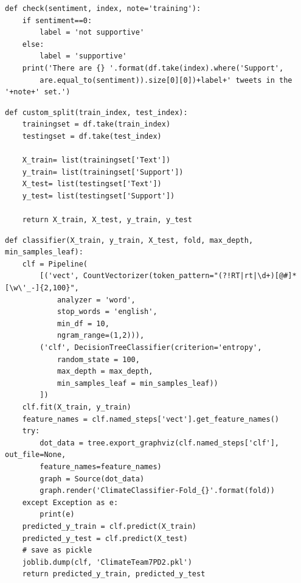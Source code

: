 \documentclass{article} %
\begin{document}
\lstset{language=Python}
\lstset{frame=lines}
\lstset{basicstyle=\footnotesize}
\begin{lstlisting}
def check(sentiment, index, note='training'):
	if sentiment==0:
		label = 'not supportive'
	else:
		label = 'supportive'
	print('There are {} '.format(df.take(index).where('Support', 
		are.equal_to(sentiment)).size[0][0])+label+' tweets in the '+note+' set.')
\end{lstlisting}

\lstset{language=Python}
\lstset{frame=lines}
\lstset{basicstyle=\footnotesize}
\begin{lstlisting}
def custom_split(train_index, test_index):
	trainingset = df.take(train_index)
	testingset = df.take(test_index)    
	
	X_train= list(trainingset['Text'])
	y_train= list(trainingset['Support'])
	X_test= list(testingset['Text'])
	y_test= list(testingset['Support'])
	
	return X_train, X_test, y_train, y_test
\end{lstlisting}



\lstset{language=Python}
\lstset{frame=lines}
\lstset{basicstyle=\footnotesize}
\begin{lstlisting}
def classifier(X_train, y_train, X_test, fold, max_depth, min_samples_leaf):
	clf = Pipeline(
		[('vect', CountVectorizer(token_pattern="(?!RT|rt|\d+)[@#]*[\w\'_-]{2,100}",
			analyzer = 'word',
			stop_words = 'english',
			min_df = 10,
			ngram_range=(1,2))),
		('clf', DecisionTreeClassifier(criterion='entropy',
			random_state = 100,
			max_depth = max_depth,
			min_samples_leaf = min_samples_leaf))
		])
	clf.fit(X_train, y_train)
	feature_names = clf.named_steps['vect'].get_feature_names()
	try:
		dot_data = tree.export_graphviz(clf.named_steps['clf'], out_file=None, 
		feature_names=feature_names)
		graph = Source(dot_data)
		graph.render('ClimateClassifier-Fold_{}'.format(fold))
	except Exception as e:
		print(e)
	predicted_y_train = clf.predict(X_train)
	predicted_y_test = clf.predict(X_test)
	# save as pickle
	joblib.dump(clf, 'ClimateTeam7PD2.pkl')
	return predicted_y_train, predicted_y_test
\end{lstlisting}
\end{document}
